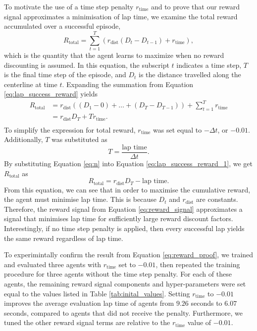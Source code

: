 To motivate the use of a time step penalty $r_{\text{time}}$ and to prove that our reward signal approximates a minimisation of lap time, we examine the total reward accumulated over a successful episode, 
\begin{equation}
        R_{\text{total}} =  \sum_{t=1}^{T} \left( r_{\text{dist}}(D_{t}-D_{t-1})+r_{\text{time}} \right),
\label{eq:lap_success_reward}
\end{equation}
which is the quantity that the agent learns to maximize when no reward discounting is assumed. 
In this equation, the subscript $t$ indicates a time step, $T$ is the final time step of the episode, and $D_t$ is the distance travelled along the centerline at time $t$.
Expanding the summation from Equation \ref{eq:lap_success_reward} yields
\begin{equation}
    \begin{split}
        R_{\text{total}}
        &= r_{\text{dist}} \left( (D_1-0) + \ldots + (D_{T} - D_{T-1}) \right) + \sum_{t=1}^{T} r_{\text{time}} \\
        &= r_{\text{dist}} D_T  + T r_{\text{time}}. \\
    \end{split}
\label{eq:lap_success_reward_1}
\end{equation}
To simplify the expression for total reward, $r_{\text{time}}$ was set equal to $-\Delta t$, or $-0.01$.
Additionally, $T$ was substituted as
\begin{equation}
T=\frac{\text{lap time}}{\Delta t}.
\label{eq:n}
\end{equation}
By substituting Equation \ref{eq:n} into Equation \ref{eq:lap_success_reward_1}, we get $R_{\text{total}}$ as
\begin{equation}\label{eq:reward_proof}
    R_{\text{total}} = r_{\text{dist}} D_T - \text{lap time}.
\end{equation}
From this equation, we can see that in order to maximise the cumulative reward, the agent must minimise lap time.
This is because $D_t$ and $r_{\text{dist}}$ are constants.
Therefore, the reward signal from Equation \ref{eq:reward_signal} approximates a signal that minimises lap time for sufficiently large reward discount factors.
Interestingly, if no time step penalty is applied, then every successful lap yields the same reward regardless of lap time.

To experimintally confirm the result from Equation \ref{eq:reward_proof}, we trained and evaluated three agents with $r_{\text{time}}$ set to $-0.01$, then repeated the training procedure for three agents without the time step penalty.
For each of these agents, the remaining reward signal components and hyper-parameters were set equal to the values listed in Table \ref{tab:inital_values}.
Setting $r_{\text{time}}$ to $-0.01$ improves the average evaluation lap time of agents from $9.26$ seconds to $6.07$ seconds, compared to agents that did not receive the penalty.
Furthermore, we tuned the other reward signal terms are relative to the $r_{\text{time}}$ value of $-0.01$.


